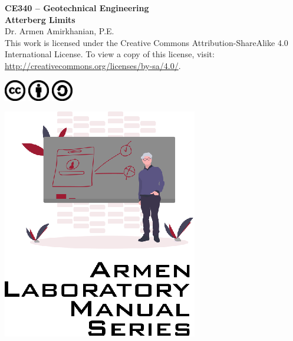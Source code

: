 \documentclass[12pt]{article}
\newcommand{\CourseNum}{CE340}
\newcommand{\CourseName}{Geotechnical Engineering}
\newcommand{\LabTitle}{Atterberg Limits}
\begin{document}
\begin{titlepage}
\begin{flushright}
\LARGE{\textbf{\CourseNum{} -- \CourseName}}\\
\vfill
\Huge{\textbf{\LabTitle}}\\
    \vfill
    \large Dr. Armen Amirkhanian, P.E.\\
\vfill
\normalsize This work is licensed under the Creative Commons Attribution-ShareAlike 4.0 International License. To view a copy of this license, visit:
\href{http://creativecommons.org/licenses/by-sa/4.0/}{http://creativecommons.org/licenses/by-sa/4.0/}.

\includegraphics[width=0.07\textwidth]{cc.eps}
\includegraphics[width=0.07\textwidth]{by.eps}
\includegraphics[width=0.07\textwidth]{sa.eps}
\vfill

\includegraphics[width=0.3\linewidth]{Logo.eps}\\ 
 
  
\end{flushright}
\end{titlepage}
\end{document}
